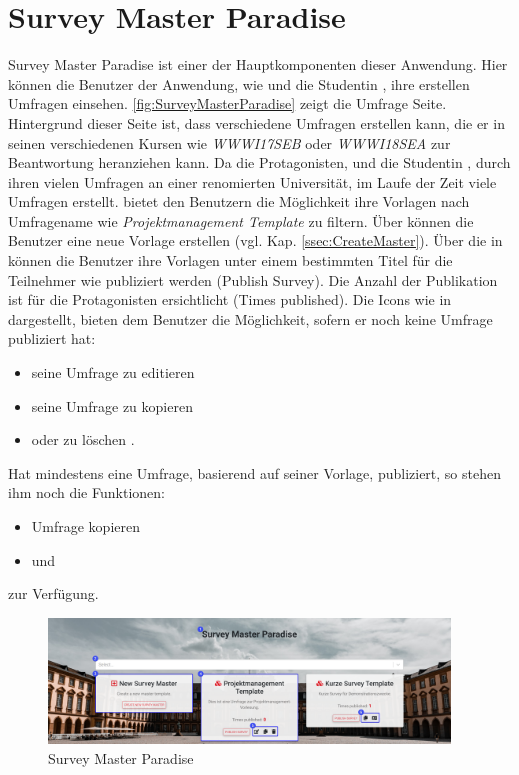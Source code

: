 \section{Survey Master Paradise}
\label{ssec:SurveyMasterParadise}
Survey Master Paradise ist einer der Hauptkomponenten dieser Anwendung. 
Hier können die Benutzer der Anwendung, wie \duzi und die Studentin \ariane, ihre erstellen Umfragen einsehen. 
\abb \vref{fig:SurveyMasterParadise} zeigt die Umfrage Seite. 
Hintergrund dieser Seite ist, dass \duzi verschiedene Umfragen erstellen kann, die er in seinen verschiedenen Kursen wie \zb \emph{WWWI17SEB} oder \emph{WWWI18SEA} zur Beantwortung heranziehen kann. %
Da die Protagonisten, \duzi und die Studentin \ariane, durch ihren vielen Umfragen an einer renomierten Universität, im Laufe der Zeit viele Umfragen erstellt. 
\desTwo bietet den Benutzern die Möglichkeit ihre Vorlagen nach Umfragename wie \zb \emph{Projektmanagement Template} zu filtern. 
Über \desThree können die Benutzer eine neue Vorlage erstellen (vgl. Kap. \vref{ssec:CreateMaster}). \newline
Über die in \desFour können die Benutzer ihre Vorlagen unter einem bestimmten Titel für die Teilnehmer wie \weigert publiziert werden (Publish Survey). 
Die Anzahl der Publikation ist für die Protagonisten ersichtlicht (Times published). \newline
Die Icons wie in \desFive dargestellt, bieten dem Benutzer die Möglichkeit, sofern er noch keine Umfrage publiziert hat:
% 
\begin{itemize}
    \item seine Umfrage zu editieren \faEdit
    \item seine Umfrage zu kopieren \faCopy
    \item oder zu löschen \faTrash.
\end{itemize}
% 
Hat \zb \duzi mindestens eine Umfrage, basierend auf seiner Vorlage, publiziert, so stehen ihm noch die Funktionen:
\begin{itemize}
    \item Umfrage kopieren \faCopy
    \item und \faIdCard
\end{itemize} 

zur Verfügung. 

\begin{figure}[H]
	\centering
	\includegraphics[width=0.95\textwidth, keepaspectratio]{img/guide/SurveyMasterParadise.png}
	\captionsetup{justification=centering, format=plain}
	\caption[Survey Master Paradise]{Survey Master Paradise \\\quelleScreenshot}
	\label{fig:SurveyMasterParadise}
\end{figure}

